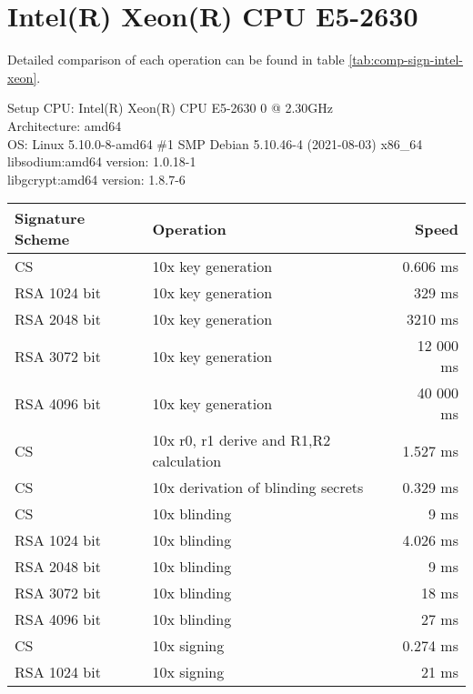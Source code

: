 \section{Intel(R) Xeon(R) CPU E5-2630}
Detailed comparison of each operation can be found in table \ref{tab:comp-sign-intel-xeon}.
\begin{bfhBox}{Setup}
	CPU: Intel(R) Xeon(R) CPU E5-2630 0 @ 2.30GHz \\
    Architecture: amd64 \\
    OS:  Linux 5.10.0-8-amd64 \#1 SMP Debian 5.10.46-4 (2021-08-03) x86\_64\\
    libsodium:amd64 version:  1.0.18-1\\ 
    libgcrypt:amd64 version:  1.8.7-6
\end{bfhBox}

\begin{table}[ht]
    \centering
    \setupBfhTabular
    \begin{tabular}{llr}
        \rowcolor{BFH-tablehead}
        \textbf{Signature Scheme} & \textbf{Operation} & \textbf{Speed} \\\hline
        CS & 10x key generation & 0.606 ms \\\hline
        RSA 1024 bit & 10x key generation & 329 ms \\\hline
        RSA 2048 bit & 10x key generation & 3210 ms \\\hline
        RSA 3072 bit & 10x key generation & 12 000 ms \\\hline
        RSA 4096 bit & 10x key generation & 40 000 ms \\\hline
        \hline
        CS & 10x r0, r1 derive and R1,R2 calculation &  1.527 ms \\\hline
        CS & 10x derivation of blinding secrets &  0.329 ms \\\hline
        CS & 10x blinding & 9 ms \\\hline
        RSA 1024 bit & 10x blinding &  4.026 ms \\\hline
        RSA 2048 bit & 10x blinding &  9 ms \\\hline
        RSA 3072 bit & 10x blinding &  18 ms \\\hline
        RSA 4096 bit & 10x blinding &  27 ms \\\hline
        \hline
        CS & 10x signing &  0.274 ms \\\hline
        RSA 1024 bit & 10x signing &  21 ms \\\hline

\end{tabular}
\end{table}
